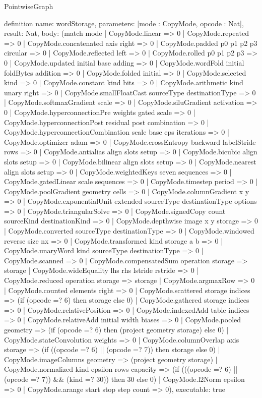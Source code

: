 \begin{lexlean}{PointwiseGraph}
\begin{semanticmodule}
definition{
  name: wordStorage,
  parameters: [mode : CopyMode, opcode : Nat],
  result: Nat,
  body: (match mode
    | CopyMode.linear => 0
    | CopyMode.repeated => 0
    | CopyMode.concatenated axis right => 0
    | CopyMode.padded p0 p1 p2 p3 circular => 0
    | CopyMode.reflected left => 0
    | CopyMode.rolled p0 p1 p2 p3 => 0
    | CopyMode.updated initial base adding => 0
    | CopyMode.wordFold initial foldBytes addition => 0
    | CopyMode.folded initial => 0
    | CopyMode.selected kind => 0
    | CopyMode.constant kind bits => 0
    | CopyMode.arithmetic kind unary right => 0
    | CopyMode.smallFloatCast sourceType destinationType => 0
    | CopyMode.softmaxGradient scale => 0
    | CopyMode.siluGradient activation => 0
    | CopyMode.hyperconnectionPre weights gated scale => 0
    | CopyMode.hyperconnectionPost residual post combination => 0
    | CopyMode.hyperconnectionCombination scale base eps iterations => 0
    | CopyMode.optimizer adam => 0
    | CopyMode.crossEntropy backward labelStride rows => 0
    | CopyMode.antialias align slots setup => 0
    | CopyMode.bicubic align slots setup => 0
    | CopyMode.bilinear align slots setup => 0
    | CopyMode.nearest align slots setup => 0
    | CopyMode.weightedKeys seven sequences => 0
    | CopyMode.gatedLinear scale sequences => 0
    | CopyMode.timestep period => 0
    | CopyMode.poolGradient geometry cells => 0
    | CopyMode.columnGradient x y => 0
    | CopyMode.exponentialUnit extended sourceType destinationType options => 0
    | CopyMode.triangularSolve => 0
    | CopyMode.signedCopy count sourceKind destinationKind => 0
    | CopyMode.depthwise image x y storage => 0
    | CopyMode.converted sourceType destinationType => 0
    | CopyMode.windowed reverse size nx => 0
    | CopyMode.transformed kind storage a b => 0
    | CopyMode.unaryWord kind sourceType destinationType => 0
    | CopyMode.scanned => 0
    | CopyMode.compensatedSum operation storage => storage
    | CopyMode.wideEquality lhs rhs lstride rstride => 0
    | CopyMode.reduced operation storage => storage
    | CopyMode.argmaxRow => 0
    | CopyMode.counted elements right => 0
    | CopyMode.scattered storage indices => (if (opcode =? 6) then storage else 0)
    | CopyMode.gathered storage indices => 0
    | CopyMode.relativePosition => 0
    | CopyMode.indexedAdd table indices => 0
    | CopyMode.relativeAdd initial width biases => 0
    | CopyMode.pooled geometry => (if (opcode =? 6) then (project geometry storage) else 0)
    | CopyMode.stateConvolution weights => 0
    | CopyMode.columnOverlap axis storage => (if ((opcode =? 6) || (opcode =? 7)) then storage else 0)
    | CopyMode.imageColumns geometry => (project geometry storage)
    | CopyMode.normalized kind epsilon rows capacity => (if (((opcode =? 6) || (opcode =? 7)) && (kind =? 30)) then 30 else 0)
    | CopyMode.l2Norm epsilon => 0
    | CopyMode.arange start stop step count => 0),
  executable: true
}


\end{semanticmodule}
\end{lexlean}

